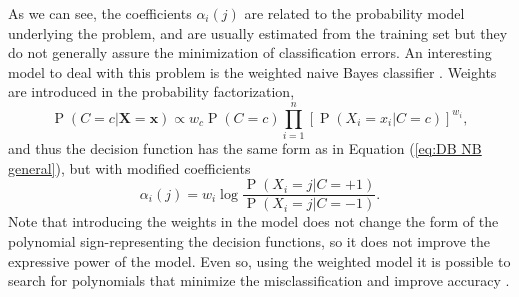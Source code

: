 \documentclass[11pt,a4paper, twoside]{book}
\newcommand{\Pp}{\operatorname{P}}
\begin{document}
As we can see, the coefficients $\alpha_i(j)$ are related to the probability model underlying the problem, and are usually estimated from the training set but they do not generally assure the minimization of classification errors.
An interesting model to deal with this problem is the weighted naive Bayes classifier \citep{Webb98,Hall2007}. Weights are introduced in the probability factorization,  
\[ \Pp(C=c|\mathbf{X}=\mathbf{x}) \propto w_c\Pp(C=c)\prod_{i=1}^{n} \left[ \Pp(X_i=x_i|C=c)\right]^{w_i} ,\]
and thus the decision function has the same form as in Equation (\ref{eq:DB NB general}), but with modified coefficients
\[ \alpha_{i}(j)= w_i \log \frac{\Pp(X_i=j|C=+1)}{\Pp(X_i=j|C=-1)} .\]
Note that introducing the weights in the model does not change the form of the polynomial sign-representing the decision functions, so it does not improve the expressive power of the model. Even so, using the weighted model it is possible to search for polynomials that minimize the misclassification and improve accuracy \citep{zaidi13}. 
\end{document}
